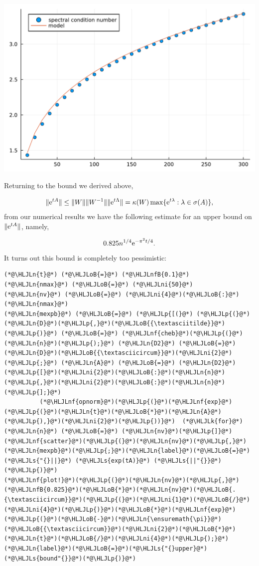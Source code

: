 \documentclass[12pt,a4paper]{article}
\newcommand{\HLJLk}[1]{\textcolor[RGB]{148,91,176}{\textbf{#1}}}
\newcommand{\HLJLn}[1]{#1}
\newcommand{\HLJLnf}[1]{\textcolor[RGB]{66,102,213}{#1}}
\newcommand{\HLJLs}[1]{\textcolor[RGB]{201,61,57}{#1}}
\newcommand{\HLJLnfB}[1]{\textcolor[RGB]{59,151,46}{#1}}
\newcommand{\HLJLni}[1]{\textcolor[RGB]{59,151,46}{#1}}
\newcommand{\HLJLoB}[1]{\textcolor[RGB]{102,102,102}{\textbf{#1}}}
\newcommand{\HLJLp}[1]{#1}
\begin{document}
\includegraphics[width=\linewidth]{jl_Vz6qXN/Chapter5_48_1.pdf}

Returning to the bound we derived above,

\[
\| {\rm e}^{tA} \| \leq \| W \| \| W^{-1} \| \| {\rm e}^{t\Lambda} \| = \kappa(W)\max\lbrace {\rm e}^{t\lambda} : \lambda \in \sigma(A)  \rbrace,
\]
from our numerical results we have the following estimate for an upper bound on $\| {\rm e}^{tA} \|$, namely,

\[
0.825 n^{1/4}{\rm e}^{-\pi^2 t/4}.
\]
It turns out this bound is completely too pessimistic:


\begin{lstlisting}
(*@\HLJLn{t}@*) (*@\HLJLoB{=}@*) (*@\HLJLnfB{0.1}@*)
(*@\HLJLn{nmax}@*) (*@\HLJLoB{=}@*) (*@\HLJLni{50}@*)
(*@\HLJLn{nv}@*) (*@\HLJLoB{=}@*) (*@\HLJLni{4}@*)(*@\HLJLoB{:}@*)(*@\HLJLn{nmax}@*)
(*@\HLJLn{mexpb}@*) (*@\HLJLoB{=}@*) (*@\HLJLp{[(}@*) (*@\HLJLp{(}@*)(*@\HLJLn{D}@*)(*@\HLJLp{,}@*)(*@\HLJLoB{{\textasciitilde}}@*)(*@\HLJLp{)}@*) (*@\HLJLoB{=}@*) (*@\HLJLnf{cheb}@*)(*@\HLJLp{(}@*)(*@\HLJLn{n}@*)(*@\HLJLp{);}@*) (*@\HLJLn{D2}@*) (*@\HLJLoB{=}@*) (*@\HLJLn{D}@*)(*@\HLJLoB{{\textasciicircum}}@*)(*@\HLJLni{2}@*)(*@\HLJLp{;}@*) (*@\HLJLn{A}@*) (*@\HLJLoB{=}@*) (*@\HLJLn{D2}@*)(*@\HLJLp{[}@*)(*@\HLJLni{2}@*)(*@\HLJLoB{:}@*)(*@\HLJLn{n}@*)(*@\HLJLp{,}@*)(*@\HLJLni{2}@*)(*@\HLJLoB{:}@*)(*@\HLJLn{n}@*)(*@\HLJLp{];}@*)
          (*@\HLJLnf{opnorm}@*)(*@\HLJLp{(}@*)(*@\HLJLnf{exp}@*)(*@\HLJLp{(}@*)(*@\HLJLn{t}@*)(*@\HLJLoB{*}@*)(*@\HLJLn{A}@*)(*@\HLJLp{),}@*)(*@\HLJLni{2}@*)(*@\HLJLp{))}@*)  (*@\HLJLk{for}@*) (*@\HLJLn{n}@*) (*@\HLJLoB{=}@*) (*@\HLJLn{nv}@*)(*@\HLJLp{]}@*)
(*@\HLJLnf{scatter}@*)(*@\HLJLp{(}@*)(*@\HLJLn{nv}@*)(*@\HLJLp{,}@*)(*@\HLJLn{mexpb}@*)(*@\HLJLp{;}@*)(*@\HLJLn{label}@*)(*@\HLJLoB{=}@*)(*@\HLJLs{"{}||}@*) (*@\HLJLs{exp(tA)}@*) (*@\HLJLs{||"{}}@*)(*@\HLJLp{)}@*)
(*@\HLJLnf{plot!}@*)(*@\HLJLp{(}@*)(*@\HLJLn{nv}@*)(*@\HLJLp{,}@*)(*@\HLJLnfB{0.825}@*)(*@\HLJLoB{*}@*)(*@\HLJLn{nv}@*)(*@\HLJLoB{.{\textasciicircum}}@*)(*@\HLJLp{(}@*)(*@\HLJLni{1}@*)(*@\HLJLoB{/}@*)(*@\HLJLni{4}@*)(*@\HLJLp{)}@*)(*@\HLJLoB{*}@*)(*@\HLJLnf{exp}@*)(*@\HLJLp{(}@*)(*@\HLJLoB{-}@*)(*@\HLJLn{\ensuremath{\pi}}@*)(*@\HLJLoB{{\textasciicircum}}@*)(*@\HLJLni{2}@*)(*@\HLJLoB{*}@*)(*@\HLJLn{t}@*)(*@\HLJLoB{/}@*)(*@\HLJLni{4}@*)(*@\HLJLp{);}@*)(*@\HLJLn{label}@*)(*@\HLJLoB{=}@*)(*@\HLJLs{"{}upper}@*) (*@\HLJLs{bound"{}}@*)(*@\HLJLp{)}@*)
\end{lstlisting}
\end{document}
